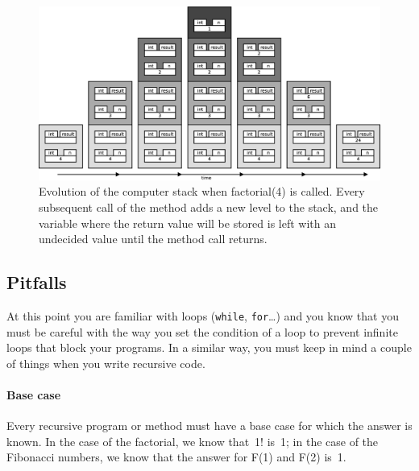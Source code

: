 \begin{figure}[hbtp]
  \centering
  \includegraphics[width=\textwidth]{gfx/recursive-factorial}
  \caption{Evolution of the computer stack when factorial(4) is
    called. Every subsequent call of the method adds a new level to
    the stack, and the variable where the return value will be stored
    is left with an undecided value until the method call returns.}
  \label{fig:fact}
\end{figure}

\subsection{Pitfalls}
\label{sec:pitfalls}

At this point you are familiar with loops (\verb+while+, 
\verb+for+\ldots) and you know that you must be careful with the
way you set the condition of a loop to prevent infinite loops that
block your programs. In a similar way, you must keep in mind a couple
of things when you write recursive code. 

\paragraph{Base case}
\label{sec:base-case}

Every recursive program or method must have a base case for which the
answer is known. In the case of the factorial, we know that~1! is~1;
in the case of the Fibonacci numbers, we know 
that the answer for F(1) and F(2) is~1.

